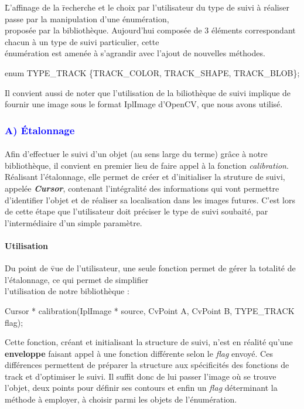 \documentclass{report}
\begin{document}
				\begin{tabbing}
				\=L'affinage de la \=recherche et le choix par l'utilisateur du type de suivi à réaliser passe par la manipulation d'une énumération,\\ \>proposée par la bibliothèque. Aujourd'hui composée de 3 éléments correspondant chacun à un type de suivi particulier, cette\\ \>énumération est amenée à s'agrandir avec l'ajout de nouvelles méthodes. \\
				\>\>\begin{itshape}enum TYPE\_TRACK \{TRACK\_COLOR, TRACK\_SHAPE, TRACK\_BLOB\};\end{itshape}
				\end{tabbing}
				\quad 
				\quad Il convient aussi de noter que l'utilisation de la biliothèque de suivi implique de fournir une image sous le format IplImage d'OpenCV, que nous avons utilisé.
				\newpage
				\subsubsection{\textcolor{blue}{A) Étalonnage}} \paragraph{}
				Afin d'effectuer le suivi d'un objet (au sens large du terme) grâce à notre bibliothèque, il convient en premier lieu de faire appel à la fonction \textit{calibration}. Réalisant l'étalonnage, elle permet de créer et d'initialiser la struture de suivi, appelée \textbf{\textit{Cursor}}, contenant l'intégralité des informations qui vont permettre d'identifier l'objet et de réaliser sa localisation dans les images futures. C'est lors de cette étape que l'utilisateur doit préciser le type de suivi soubaité, par l'intermédiaire d'un simple paramètre.
					\paragraph{Utilisation}
					\begin{tabbing}
					\quad Du point de \=vue de l'utilisateur, une seule fonction permet de gérer la totalité de l'étalonnage, ce qui permet de simplifier\\ l'utilisation de notre bibliothèque : \\
					\>\begin{itshape}Cursor * calibration(IplImage * source, CvPoint A, CvPoint B, TYPE\_TRACK flag);\end{itshape}
					\end {tabbing}
					\quad Cette fonction, créant et initialisant la structure de suivi, n'est en réalité qu'une \textbf{enveloppe} faisant appel à une fonction différente selon le \textit{flag} envoyé. Ces différences permettent de préparer la structure aux spécificités des fonctions de track et d'optimiser le suivi. Il suffit donc de lui passer l'image où se trouve l'objet, deux points pour définir ses contours et enfin un \textit{flag} déterminant la méthode à employer, à choisir parmi les objets de l'énumération.
\end{document}
